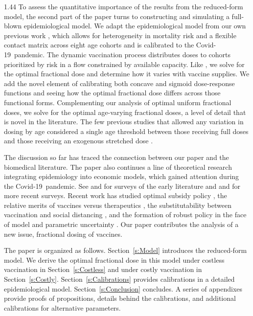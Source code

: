 \documentclass[12pt]{article}
\newcommand{\covid}{Covid-19}
\begin{document}
\begin{spacing}{1.44}
To assess the quantitative importance of the results from the
reduced-form model, the second part of the paper turns to constructing
and simulating a full-blown epidemiological model. We adapt the
epidemiological model from our own previous work \citet{Wiecek2022},
which allows for heterogeneity in mortality risk and a flexible
contact matrix across eight age cohorts and is calibrated to the
\covid\ pandemic. The dynamic vaccination process distributes doses to
cohorts prioritized by risk in a flow constrained by available
capacity. Like \citet{Riley2007}, we solve for the optimal fractional
dose and determine how it varies with vaccine supplies. We add the
novel element of calibrating both concave and sigmoid dose-response
functions and seeing how the optimal fractional dose differs across
those functional forms.  Complementing our analysis of optimal uniform
fractional doses, we solve for the optimal age-varying fractional
doses, a level of detail that is novel in the literature. The few
previous studies that allowed any variation in dosing by age
considered a single age threshold between those receiving full doses
and those receiving an exogenous stretched dose
\citep{Wu2016,Leung2022}.

The discussion so far has traced the connection between our paper and
the biomedical literature. The paper also continues a line of
theoretical research integrating epidemiology into economic models,
which gained attention during the \covid\ pandemic. See
\citet{Philipson2000} and \citet{Philipson2016} for surveys of the
early literature and \citet{McAdams2021} and \citet{Avery2024} for
more recent surveys.  Recent work has studied optimal subsidy policy
\citep{Goodkin-Gold2024}, the relative merits of vaccines versus
therapeutics \citep{LaTorre2020,Toxvaerd2022}, the substitutability
between vaccination and social distancing
\citep{Atkeson2021,Avery2024}, and the formation of robust policy in
the face of model and parametric uncertainty
\citep{Manski2020,Gans2022}. Our paper contributes the analysis of a
new issue, fractional dosing of vaccines.

The paper is organized as follows. Section~\ref{s:Model} introduces
the reduced-form model. We derive the optimal fractional dose in this
model under costless vaccination in Section~\ref{s:Costless} and under
costly vaccination in
Section~\ref{s:Costly}. Section~\ref{s:Calibrations} provides
calibrations in a detailed epidemiological
model. Section~\ref{s:Conclusion} concludes. A series of appendixes
provide proofs of propositions, details behind the calibrations, and
additional calibrations for alternative parameters.


\end{spacing}
\end{document}
